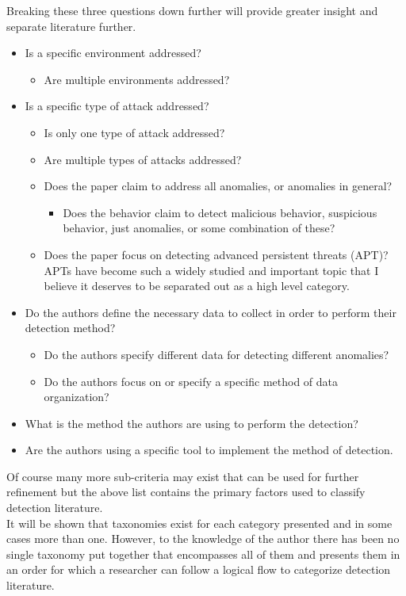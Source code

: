 \documentclass[conference]{IEEEtran}
\begin{document}
Breaking these three questions down further will provide greater insight and separate literature further.
\begin{itemize}
    \item Is a specific environment addressed?
        \begin{itemize}
            \item Are multiple environments addressed?
        \end{itemize}
    \item Is a specific type of attack addressed?
    \begin{itemize}
        \item Is only one type of attack addressed?
        \item Are multiple types of attacks addressed?
        \item Does the paper claim to address all anomalies, or anomalies in general?
        \begin{itemize}
            \item Does the behavior claim to detect malicious behavior, suspicious behavior, just anomalies, or some combination of these?
        \end{itemize}
        \item Does the paper focus on detecting advanced persistent threats (APT)?\\
        APTs have become such a widely studied and important topic that I believe it deserves to be separated out as a high level category.
    \end{itemize}
    \item Do the authors define the necessary data to collect in order to perform their detection method?
        \begin{itemize}
            \item Do the authors specify different data for detecting different anomalies?
            \item Do the authors focus on or specify a specific method of data organization?
        \end{itemize}
    \item What is the method the authors are using to perform the detection?
    \item Are the authors using a specific tool to implement the method of detection.
\end{itemize}
Of course many more sub-criteria may exist that can be used for further refinement but the above list contains the primary factors used to classify detection literature.
\\ It will be shown that taxonomies exist for each category presented and in some cases more than one. However, to the knowledge of the author there has been no single taxonomy put together that encompasses all of them and presents them in an order for which a researcher can follow a logical flow to categorize detection literature.
\end{document}

